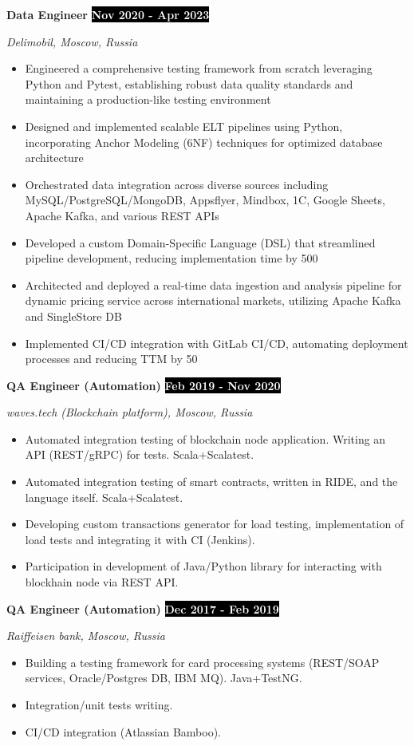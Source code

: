 \documentclass[11pt,a4paper]{article}
\newcommand{\timeperiod}[1]{%
    \hfill{\small\colorbox{black}{\textcolor{white}{\textbf{#1}}}}\par%
}
\newcommand{\jobsep}{\vspace{1.5em}}
\begin{document}
\jobsep
\textbf{Data Engineer}\timeperiod{Nov 2020 - Apr 2023}
\textit{Delimobil, Moscow, Russia}
\begin{itemize}
    \item Engineered a comprehensive testing framework from scratch leveraging Python and Pytest, establishing robust data quality standards and maintaining a production-like testing environment
    \item Designed and implemented scalable ELT pipelines using Python, incorporating Anchor Modeling (6NF) techniques for optimized database architecture
    \item Orchestrated data integration across diverse sources including MySQL/PostgreSQL/MongoDB, Appsflyer, Mindbox, 1C, Google Sheets, Apache Kafka, and various REST APIs
    \item Developed a custom Domain-Specific Language (DSL) that streamlined pipeline development, reducing implementation time by 500%
    \item Architected and deployed a real-time data ingestion and analysis pipeline for dynamic pricing service across international markets, utilizing Apache Kafka and SingleStore DB
    \item Implemented CI/CD integration with GitLab CI/CD, automating deployment processes and reducing TTM by 50%
\end{itemize}

\jobsep
\textbf{QA Engineer (Automation)}\timeperiod{Feb 2019 - Nov 2020}
\textit{waves.tech (Blockchain platform), Moscow, Russia}
\begin{itemize}
    \item Automated integration testing of blockchain node application. Writing an API (REST/gRPC) for tests. Scala+Scalatest.
    \item Automated integration testing of smart contracts, written in RIDE, and the language itself. Scala+Scalatest.
    \item Developing custom transactions generator for load testing, implementation of load tests and integrating it with CI (Jenkins).
    \item Participation in development of Java/Python library for interacting with blockhain node via REST API.
\end{itemize}

\jobsep
\textbf{QA Engineer (Automation)}\timeperiod{Dec 2017 - Feb 2019}
\textit{Raiffeisen bank, Moscow, Russia}
\begin{itemize}
    \item Building a testing framework for card processing systems (REST/SOAP services, Oracle/Postgres DB, IBM MQ). Java+TestNG.
    \item Integration/unit tests writing.
    \item CI/CD integration (Atlassian Bamboo).
\end{itemize}
\end{document}

